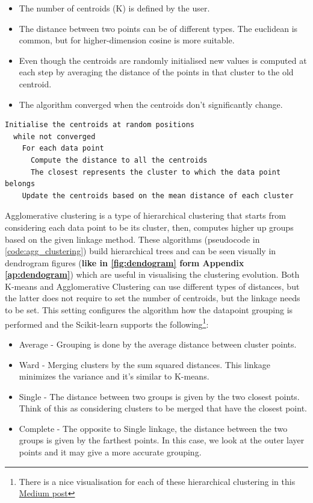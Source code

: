 \begin{itemize}
  \item The number of centroids (K) is defined by the user.
  \item The distance between two points can be of different types. The euclidean is common, but for higher-dimension cosine is more suitable.
  \item Even though the centroids are randomly initialised new values is computed at each step by averaging the distance of the points in that cluster to the old centroid.
  \item The algorithm converged when the centroids don't significantly change.
\end{itemize}

\begin{lstlisting}[caption={K-means pseudocode}, label={code:k-means}]
  Initialise the centroids at random positions
  while not converged 
    For each data point
      Compute the distance to all the centroids
      The closest represents the cluster to which the data point belongs
    Update the centroids based on the mean distance of each cluster
\end{lstlisting} 

Agglomerative clustering is a type of hierarchical clustering that starts from considering each data point to be its cluster, then, computes higher up groups based on the given linkage method. These algorithms (pseudocode in \cref{code:agg_clustering}) build hierarchical trees and can be seen visually in dendrogram figures (\textbf{like in \cref{fig:dendogram} form Appendix \ref{ap:dendogram}}) which are useful in visualising the clustering evolution. Both K-means and Agglomerative Clustering can use different types of distances, but the latter does not require to set the number of centroids, but the linkage needs to be set. This setting configures the algorithm how the datapoint grouping is performed and the Scikit-learn supports the following\footnote{
  There is a nice visualisation for each of these hierarchical clustering in this \href{https://towardsdatascience.com/machine-learning-algorithms-part-12-hierarchical-agglomerative-clustering-example-in-python-1e18e0075019}{Medium post} }:
\begin{itemize}
  \item Average - Grouping is done by the average distance between cluster points.
  \item Ward - Merging clusters by the sum squared distances. This linkage minimizes the variance and it's similar to K-means.
  \item Single - The distance between two groups is given by the two closest points. Think of this as considering clusters to be merged that have the closest point.
  \item Complete - The opposite to Single linkage, the distance between the two groups is given by the farthest points. In this case, we look at the outer layer points and it may give a more accurate grouping.
\end{itemize}


